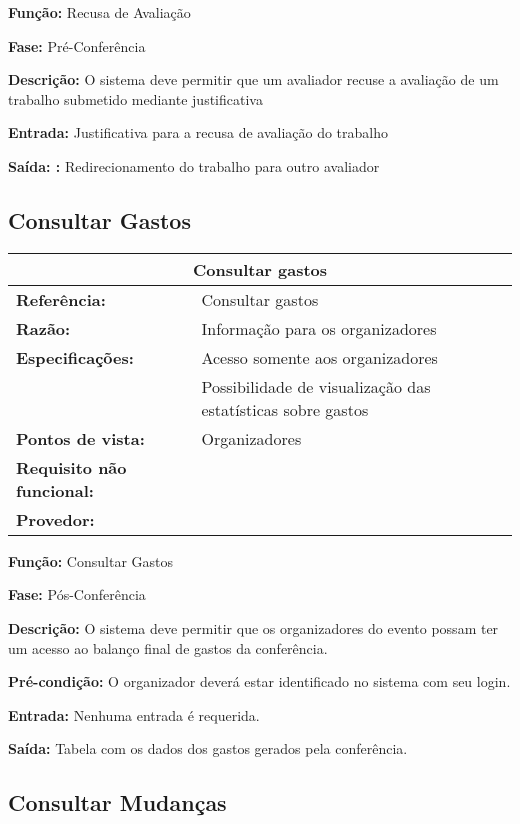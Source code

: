 \documentclass[letter]{article}
\begin{document}
\textbf{Função:} Recusa de Avaliação

\textbf{Fase: } Pré-Conferência

\textbf{Descrição: } O sistema deve permitir que um avaliador recuse a avaliação de um trabalho submetido mediante justificativa

\textbf{Entrada: } Justificativa para a recusa de avaliação do trabalho

\textbf{Saída: :} Redirecionamento do trabalho para outro avaliador




\subsection{Consultar Gastos}

%
\begin{table}[h!]\begin{center}
\begin{tabular}{|ll|}
\hline 
\multicolumn{2}{|c|}{\textbf{Consultar gastos}}\tabularnewline
\hline
\textbf{Referência:} & Consultar gastos\tabularnewline
\textbf{Razão:} & Informação para os organizadores\tabularnewline
\textbf{Especificações:} & Acesso somente aos organizadores\tabularnewline
 & Possibilidade de visualização das estatísticas sobre gastos\tabularnewline
\textbf{Pontos de vista:} & Organizadores\tabularnewline
\textbf{Requisito não funcional:} & \tabularnewline
\textbf{Provedor:} & \tabularnewline
\hline\end{tabular}\end{center}
\end{table}


\textbf{Função:}  Consultar Gastos

\textbf{Fase:}  Pós-Conferência

\textbf{Descrição: } O sistema deve permitir que os organizadores do evento possam ter um acesso ao balanço final de gastos da conferência.

\textbf{Pré-condição:}  O organizador deverá estar identificado no sistema com seu login.

\textbf{Entrada: } Nenhuma entrada é requerida.

\textbf{Saída:}  Tabela com os dados dos gastos gerados pela conferência.

\newpage
\subsection{Consultar Mudanças}
\end{document}

